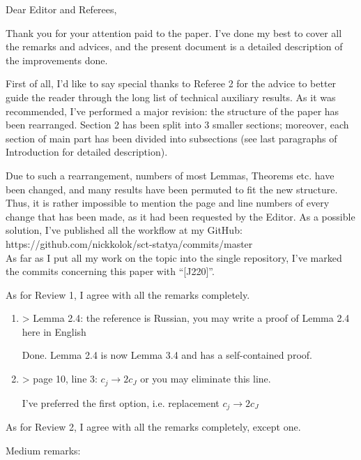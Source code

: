 \documentclass[a4paper,14pt]{article} %
\begin{document}
Dear Editor and Referees,

Thank you for your attention paid to the paper.
I've done my best to cover all the remarks and advices,
and the present document is a detailed description of the improvements done.

First of all, I'd like to say special thanks to Referee 2 for the advice
to better guide the reader through the long list of technical auxiliary results.
As it was recommended, I've performed a major revision:
the structure of the paper has been rearranged.
Section 2 has been split into 3 smaller sections;
moreover, each section of main part has been divided into subsections
(see last paragraphs of Introduction for detailed description).

Due to such a rearrangement, numbers of most Lemmas, Theorems etc. have been changed,
and many results have been permuted to fit the new structure.
Thus, it is rather impossible to mention the page and line numbers of every change that has been made,
as it had been requested by the Editor.
As a possible solution, I've published all the workflow at my GitHub:
\\
https://github.com/nickkolok/sct-statya/commits/master
\\
As far as I put all my work on the topic into the single repository,
I've marked the commits concerning this paper with ``[J220]''.

As for Review 1, I agree with all the remarks completely.
\begin{enumerate}
	\item
		> Lemma 2.4: the reference is Russian, you may write a proof of Lemma 2.4 here in English

		Done. Lemma 2.4 is now Lemma 3.4 and has a self-contained proof.

	\item

		> page 10, line 3: $c_j \rightarrow 2c_J$ or you may eliminate this line.

		I've preferred the first option, i.e. replacement $c_j \rightarrow 2c_J$
\end{enumerate}

As for Review 2, I agree with all the remarks completely, except one.

Medium remarks:
\end{document}
